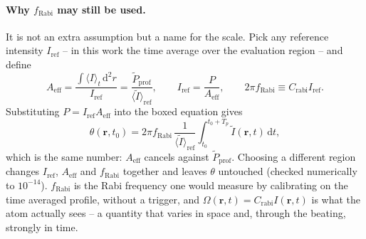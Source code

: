 \paragraph{Why $f_\mathrm{Rabi}$ may still be used.}
It is not an extra assumption but a name for the scale. Pick any reference
intensity $I_\mathrm{ref}$ -- in this work the time average over the evaluation
region -- and define
\begin{equation}
A_\mathrm{eff}=\frac{\int\langle I\rangle_t\,\mathrm d^2r}{I_\mathrm{ref}}
=\frac{\tilde P_\mathrm{prof}}{\langle\tilde I\rangle_\mathrm{ref}},
\qquad
I_\mathrm{ref}=\frac{P}{A_\mathrm{eff}},
\qquad
2\pi f_\mathrm{Rabi}\equiv C_\mathrm{rabi}I_\mathrm{ref} .
\end{equation}
Substituting $P=I_\mathrm{ref}A_\mathrm{eff}$ into the boxed equation gives
\begin{equation}
\theta(\mathbf r,t_0)
=2\pi f_\mathrm{Rabi}\,
\frac{1}{\langle\tilde I\rangle_\mathrm{ref}}
\int_{t_0}^{t_0+T_p}\!\tilde I(\mathbf r,t)\,\mathrm dt ,
\end{equation}
which is the same number: $A_\mathrm{eff}$ cancels against
$\tilde P_\mathrm{prof}$. Choosing a different region changes $I_\mathrm{ref}$,
$A_\mathrm{eff}$ and $f_\mathrm{Rabi}$ together and leaves $\theta$ untouched
(checked numerically to $10^{-14}$). $f_\mathrm{Rabi}$ is the Rabi frequency one
would measure by calibrating on the time averaged profile, without a trigger,
and $\Omega(\mathbf r,t)=C_\mathrm{rabi}I(\mathbf r,t)$ is what the atom
actually sees -- a quantity that varies in space and, through the beating,
strongly in time.


